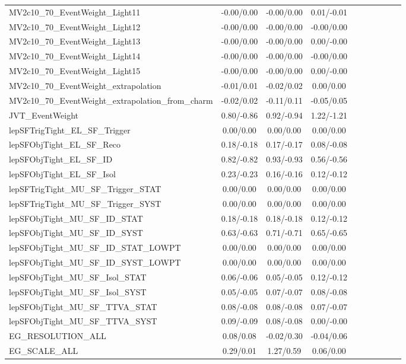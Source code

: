 \begin{table}[h]
\begin{center}
\begin{tabular}{l|ccccccccc}
MV2c10\_70\_EventWeight\_Light11 &-0.00/0.00 &-0.00/0.00 &0.01/-0.01 \\
MV2c10\_70\_EventWeight\_Light12 &-0.00/0.00 &-0.00/0.00 &-0.00/0.00 \\
MV2c10\_70\_EventWeight\_Light13 &-0.00/0.00 &-0.00/0.00 &0.00/-0.00 \\
MV2c10\_70\_EventWeight\_Light14 &-0.00/0.00 &-0.00/0.00 &-0.00/0.00 \\
MV2c10\_70\_EventWeight\_Light15 &-0.00/0.00 &-0.00/0.00 &0.00/-0.00 \\
MV2c10\_70\_EventWeight\_extrapolation &-0.01/0.01 &-0.02/0.02 &0.00/0.00 \\
MV2c10\_70\_EventWeight\_extrapolation\_from\_charm &-0.02/0.02 &-0.11/0.11 &-0.05/0.05 \\
JVT\_EventWeight &0.80/-0.86 &0.92/-0.94 &1.22/-1.21 \\
lepSFTrigTight\_EL\_SF\_Trigger &0.00/0.00 &0.00/0.00 &0.00/0.00 \\
lepSFObjTight\_EL\_SF\_Reco &0.18/-0.18 &0.17/-0.17 &0.08/-0.08 \\
lepSFObjTight\_EL\_SF\_ID &0.82/-0.82 &0.93/-0.93 &0.56/-0.56 \\
lepSFObjTight\_EL\_SF\_Isol &0.23/-0.23 &0.16/-0.16 &0.12/-0.12 \\
lepSFTrigTight\_MU\_SF\_Trigger\_STAT &0.00/0.00 &0.00/0.00 &0.00/0.00 \\
lepSFTrigTight\_MU\_SF\_Trigger\_SYST &0.00/0.00 &0.00/0.00 &0.00/0.00 \\
lepSFObjTight\_MU\_SF\_ID\_STAT &0.18/-0.18 &0.18/-0.18 &0.12/-0.12 \\
lepSFObjTight\_MU\_SF\_ID\_SYST &0.63/-0.63 &0.71/-0.71 &0.65/-0.65 \\
lepSFObjTight\_MU\_SF\_ID\_STAT\_LOWPT &0.00/0.00 &0.00/0.00 &0.00/0.00 \\
lepSFObjTight\_MU\_SF\_ID\_SYST\_LOWPT &0.00/0.00 &0.00/0.00 &0.00/0.00 \\
lepSFObjTight\_MU\_SF\_Isol\_STAT &0.06/-0.06 &0.05/-0.05 &0.12/-0.12 \\
lepSFObjTight\_MU\_SF\_Isol\_SYST &0.05/-0.05 &0.07/-0.07 &0.08/-0.08 \\
lepSFObjTight\_MU\_SF\_TTVA\_STAT &0.08/-0.08 &0.08/-0.08 &0.07/-0.07 \\
lepSFObjTight\_MU\_SF\_TTVA\_SYST &0.09/-0.09 &0.08/-0.08 &0.00/-0.00 \\
EG\_RESOLUTION\_ALL &0.08/0.08 &-0.02/0.30 &-0.04/0.06 \\
EG\_SCALE\_ALL &0.29/0.01 &1.27/0.59 &0.06/0.00 \\

\end{tabular}
\end{center}
\end{table}
